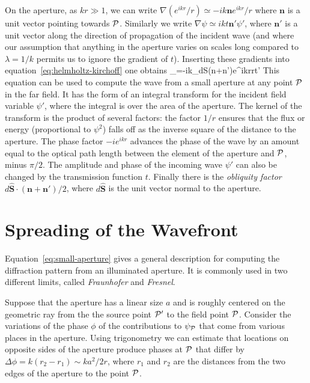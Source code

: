 On the aperture, as $kr\gg 1$, we can write $\nabla({e^{ikr}/r})\simeq -{ik{\bm n}e^{ikr}/r}$ 
where ${\bm n}$ is a unit vector pointing towards ${\cal P}$. Similarly we write 
$\nabla\psi\simeq ikt{\bm n'}\psi'$, where ${\bm n'}$ is a unit vector along the direction
of propagation of the incident wave (and where our assumption that anything in the aperture
varies on scales long compared to $\lambda={1/k}$ permits us to ignore the gradient of $t$).
Inserting these gradients into equation~\ref{eq:helmholtz-kirchoff} one obtains
\be
\psi_=-{ik\pi}\int_d{\bm S}\cdot\left({{\bm n}+{\bm n'}}\right){e^{ikr}\over r}t\psi'
\label{eq:small-aperture}
\ee
This equation can be used to compute the wave from a small aperture at any point ${\cal P}$ in 
the far field. It has the form of an integral transform for the incident field variable $\psi'$,
where the integral is over the area of the aperture. The kernel of the transform is the 
product of several factors: the factor ${1/r}$ ensures that the flux or energy (proportional
to $\psi^2$) falls off as the inverse square of the distance to the aperture. The phase 
factor $-ie^{ikr}$ advances the phase of the wave by an amount equal to the optical path 
length between the element of the aperture and ${\cal P}$, minus ${\pi/2}$. The amplitude and
phase of the incoming wave $\psi'$ can also be changed by the transmission function $t$.
Finally there is the {\it obliquity factor} ${d\hat{\bm S}\cdot({\bm n}+{\bm n'})/2}$, where 
$d\hat{\bm S}$ is the unit vector normal to the aperture. 

\section{Spreading of the Wavefront}

Equation~\ref{eq:small-aperture} gives a general description for computing the diffraction 
pattern from an illuminated aperture. It is commonly used in two different limits, called
{\it Fraunhofer} and {\it Fresnel}.

Suppose that the aperture has a linear size $a$ and is roughly centered on the geometric ray
from the the source point ${\cal P}'$ to the field point ${\cal P}$. Consider the variations of 
the phase $\phi$ of the contributions to $\psi_{\cal P}$ that come from various places in the
aperture. Using trigonometry we can estimate that locations on opposite sides of the aperture
produce phases at ${\cal P}$ that differ by $\Delta\phi=k(r_2-r_1)\sim {ka^2/2r}$, where $r_1$ and
$r_2$ are the distances from the two edges of the aperture to the point ${\cal P}$. 

